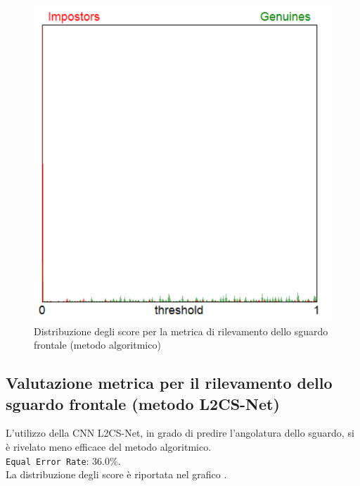\documentclass[12pt,a4paper,openright,twoside]{book}
\begin{document}
\begin{figure}
    \centering
    \includegraphics[width=.8\linewidth]{figures/score-distribution-frontal-gaze-algo.png}
    \caption{Distribuzione degli score per la metrica di rilevamento dello sguardo frontale (metodo algoritmico)}
    \label{fig:score_distribution_frontal_gaze_algo}
\end{figure}

\subsection{Valutazione metrica per il rilevamento dello sguardo frontale (metodo L2CS-Net)}
L'utilizzo della CNN L2CS-Net, in grado di predire l'angolatura dello sguardo, si è rivelato meno efficace del metodo algoritmico. \\[4pt]
\texttt{Equal Error Rate}: 36.0\%. \\
La distribuzione degli score è riportata nel grafico .
\end{document}
